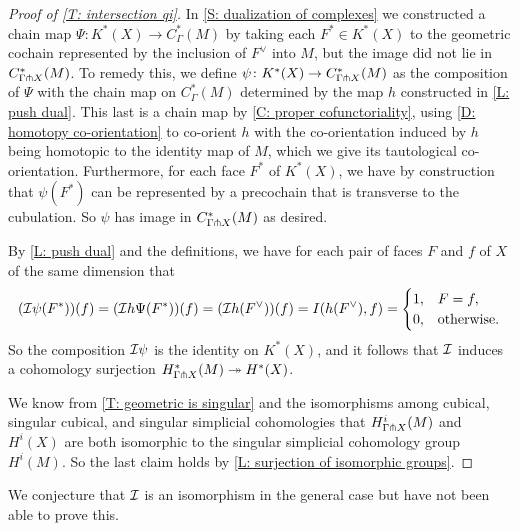 \begin{proof}[Proof of \cref{T: intersection qi}]
	In \cref{S: dualization of complexes} we constructed a chain map $\Psi \colon K^*(X) \to C_\Gamma^*(M)$ by taking each $F^* \in K^*(X)$ to the geometric cochain represented by the inclusion of $F^\vee$ into $M$, but the image did not lie in $C^*_{\Gamma \pitchfork X}(M)$.
	To remedy this, we define $\psi \colon K^*(X) \to C_{\Gamma \pitchfork X}^*(M)$ as the composition of $\Psi$ with the chain map on $C^*_{\Gamma}(M)$ determined by the map $h$ constructed in \cref{L: push dual}.
	This last is a chain map by \cref{C: proper cofunctoriality}, using \cref{D: homotopy co-orientation} to co-orient $h$ with the co-orientation induced by $h$ being homotopic to the identity map of $M$, which we give its tautological co-orientation.
	Furthermore, for each face $F^*$ of $K^*(X)$, we have by construction that $\psi(F^*)$ can be represented by a precochain that is transverse to the cubulation.
	So $\psi$ has image in $C_{\Gamma \pitchfork X}^*(M)$ as desired.

	By \cref{L: push dual} and the definitions, we have for each pair of faces $F$ and $f$ of $X$ of the same dimension that
	\begin{equation*}
		(\mathcal{I} \psi(F^*))(f) = (\mathcal{I} h \Psi(F^*))(f)\\
		= (\mathcal{I} h (F^\vee))(f)\\
		= I( h (F^\vee) , f) \\
		=
		\begin{cases}
			1, & F=f,\\
			0, & \text{otherwise.}
		\end{cases}
	\end{equation*}
	So the composition $\mathcal{I} \psi$ is the identity on $K^*(X)$, and it follows that $\mathcal{I}$ induces a cohomology surjection $H^*_{\Gamma \pitchfork X}(M)\twoheadrightarrow H^*(X)$.

	We know from \cref{T: geometric is singular} and the isomorphisms among cubical, singular cubical, and singular simplicial cohomologies that $H^i_{\Gamma \pitchfork X}(M)$ and $H^i(X)$ are both isomorphic to the singular simplicial cohomology group $H^i(M)$.
	So the last claim holds by \cref{L: surjection of isomorphic groups}.
\end{proof}

We conjecture that $\mathcal{I}$ is an isomorphism in the general case but have not been able to prove this.

